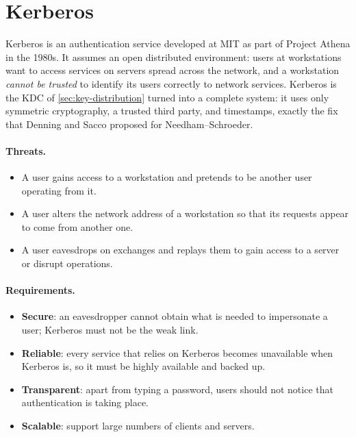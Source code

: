 \section{Kerberos}
\label{sec:kerberos}

Kerberos is an authentication service developed at MIT as part of Project Athena in the 1980s. It assumes an open distributed environment: users at workstations want to access services on servers spread across the network, and a workstation \emph{cannot be trusted} to identify its users correctly to network services. Kerberos is the KDC of \cref{sec:key-distribution} turned into a complete system: it uses only symmetric cryptography, a trusted third party, and timestamps, exactly the fix that Denning and Sacco proposed for Needham--Schroeder.


\paragraph{Threats.}
\begin{itemize}
    \item A user gains access to a workstation and pretends to be another user operating from it.
    \item A user alters the network address of a workstation so that its requests appear to come from another one.
    \item A user eavesdrops on exchanges and replays them to gain access to a server or disrupt operations.
\end{itemize}

\paragraph{Requirements.}
\begin{itemize}
    \item \textbf{Secure}: an eavesdropper cannot obtain what is needed to impersonate a user; Kerberos must not be the weak link.
    \item \textbf{Reliable}: every service that relies on Kerberos becomes unavailable when Kerberos is, so it must be highly available and backed up.
    \item \textbf{Transparent}: apart from typing a password, users should not notice that authentication is taking place.
    \item \textbf{Scalable}: support large numbers of clients and servers.
\end{itemize}

